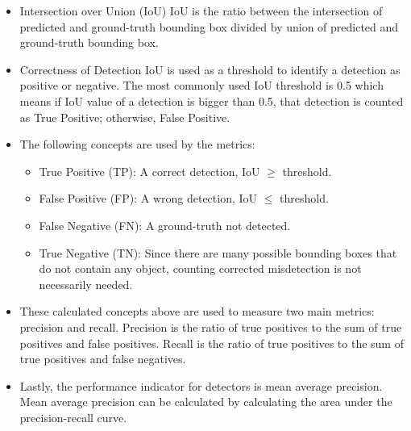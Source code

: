\documentclass{article}
\begin{document}
\begin{itemize}
    \item Intersection over Union (IoU)
    IoU is the ratio between the intersection of predicted and ground-truth bounding box 
    divided by union of predicted and ground-truth bounding box. 
    \item Correctness of Detection
    IoU is used as a threshold to identify a detection as positive or negative. The 
    most commonly used IoU threshold is 0.5 which means if IoU value of a detection is 
    bigger than 0.5, that detection is counted as True Positive; otherwise, False Positive.
    \item The following concepts are used by the metrics:
    \begin{itemize}
        \item True Positive (TP): A correct detection, IoU $\geq$ threshold. 
        \item False Positive (FP): A wrong detection, IoU $\leq$ threshold.
        \item False Negative (FN): A ground-truth not detected.
        \item True Negative (TN): Since there are many possible bounding boxes that 
        do not contain any object, counting corrected misdetection is not necessarily 
        needed.
    \end{itemize}
    \item These calculated concepts above are used to measure two main metrics: precision and 
    recall. Precision is the ratio of true positives to the sum of true positives and false 
    positives. Recall is the ratio of true positives to the sum of true positives and false 
    negatives.
    \item Lastly, the performance indicator for detectors is mean average precision. Mean 
    average precision can be calculated by calculating the area under the precision-recall curve.
\end{itemize}
\end{document}
